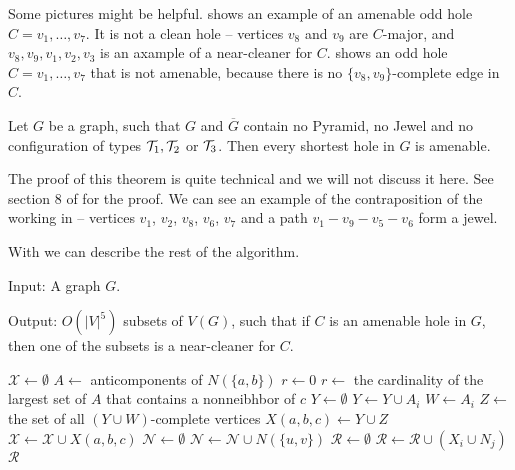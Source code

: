 Some pictures might be helpful.  shows an example of an amenable odd hole $C = v_1, \ldots, v_7$. It is not a clean hole -- vertices $v_8$ and $v_9$ are $C$-major, and $v_8, v_9, v_1, v_2, v_3$ is an axample of a near-cleaner for $C$.
 shows an odd hole $C = v_1, \ldots, v_7$ that is not amenable, because there is no $\{v_8, v_9\}$-complete edge in $C$.

\begin{theorem}
	\label{thm:amenableHoles}
	Let $G$ be a graph, such that $G$ and $\overline{G}$ contain no Pyramid, no Jewel and no configuration of types $\mathcal{T}_1, \mathcal{T}_2$ or $\mathcal{T}_3$. Then every shortest hole in $G$ is amenable.
\end{theorem}

The proof of this theorem is quite technical and we will not discuss it here. See section 8 of \cite{MC05} for the proof. We can see an example of the contraposition of the  working in  -- vertices $v_1$, $v_2$, $v_8$, $v_6$, $v_7$ and a path $v_1-v_9-v_5-v_6$ form a jewel.

With  we can describe the rest of the algorithm.

\begin{alg}
	\label{alg:listNearCleaners}
	Input: A graph $G$.

	\noindent Output: $O(|V|^5)$ subsets of $V(G)$, such that if $C$ is an amenable hole in $G$, then one of the subsets is a near-cleaner for $C$.
\end{alg}

\begin{algorithmic}[1]
	\ls $\mathcal{X} \gets \emptyset$
		\ls $A \gets$ anticomponents of $N(\{a, b\})$
			\ls $r \gets 0$
		\mElse
			\ls $r \gets$ the cardinality of the largest set of $A$ that contains 
			\lsx a nonneibhbor of $c$ 
		\mEndIf
		\ls $Y \gets \emptyset$ 
				\ls $Y \gets Y \cup A_i$
			\mEndIf
				\ls $W \gets A_i$
			\mEndIf
		\mEndFor
		\ls $Z \gets$ the set of all $(Y \cup W)$-complete vertices
		\ls $X(a, b, c) \gets Y \cup Z$ 
		\ls $\mathcal{X} \gets \mathcal{X} \cup X(a, b, c)$
	\mEndFor
	\ls $\mathcal{N} \gets \emptyset$
		\ls $\mathcal{N} \gets \mathcal{N} \cup N(\{u, v\})$
	\mEndFor
	\ls $\mathcal{R} \gets \emptyset$
			\ls $\mathcal{R} \gets \mathcal{R} \cup (X_i \cup N_j)$ \label{line:listNCcalcR}
		\mEndFor
	\mEndFor
	\ls \RETURN $\mathcal{R}$
	\mEndProcedure
\end{algorithmic}

